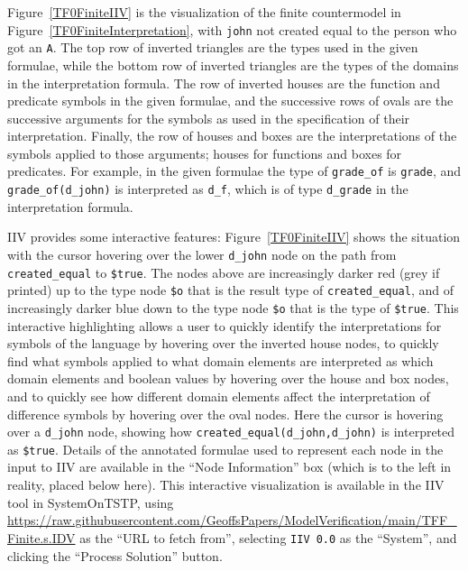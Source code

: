 \documentclass[letterpaper]{article}
\newcommand{\smalltt}[1]{\small \texttt{#1}}
\begin{document}
Figure~\ref{TF0FiniteIIV} is the visualization of the finite countermodel in 
Figure~\ref{TF0FiniteInterpretation}, with {\smalltt{john}} not created equal to the person
who got an {\smalltt{A}}.
The top row of inverted triangles are the types used in the given formulae,
while the bottom row of inverted triangles are the types of the domains in the interpretation
formula.
The row of inverted houses are the function and predicate symbols in the given formulae,
and the successive rows of ovals are the successive arguments for the symbols as used in the
specification of their interpretation.
Finally, the row of houses and boxes are the interpretations of the symbols applied to those
arguments; houses for functions and boxes for predicates.
For example, in the given formulae the type of {\smalltt{grade\_of}} is {\smalltt{grade}},
and {\smalltt{grade\_of(d\_john)}} is interpreted as {\smalltt{d\_f}}, which is of type
{\smalltt{d\_grade}} in the interpretation formula.

IIV provides some interactive features: Figure~\ref{TF0FiniteIIV} shows the situation with 
the cursor hovering over the lower {\smalltt{d\_john}} node on the path from 
{\smalltt{created\_equal}} to {\smalltt{\$true}}.
The nodes above are increasingly darker red (grey if printed) up to the type node {\smalltt{\$o}} 
that is the result type of {\smalltt{created\_equal}}, and of increasingly darker blue down to 
the type node {\smalltt{\$o}} that is the type of {\smalltt{\$true}}.
This interactive highlighting allows a user to quickly identify the interpretations for symbols
of the language by hovering over the inverted house nodes, to quickly find what symbols applied to
what domain elements are interpreted as which domain elements and boolean values by hovering over
the house and box nodes, and to quickly see how different domain elements affect the interpretation
of difference symbols by hovering over the oval nodes.
Here the cursor is hovering over a {\smalltt{d\_john}} node, showing how
{\smalltt{created\_equal(d\_john,d\_john)}} is interpreted as {\smalltt{\$true}}.
Details of the annotated formulae used to represent each node in the input to IIV are available 
in the ``Node Information'' box (which is to the left in reality, placed below here).
This interactive visualization is available in the IIV tool in SystemOnTSTP, using 
{\scriptsize \url{https://raw.githubusercontent.com/GeoffsPapers/ModelVerification/main/TFF_Finite.s.IDV}}
as the ``URL to fetch from'', selecting {\tt IIV 0.0} as the ``System'', and clicking the
``Process Solution'' button.
\end{document}

